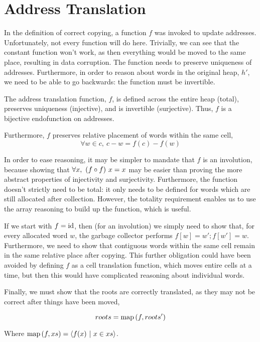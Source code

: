 \section{Address Translation}
\label{sec:copying-address}

In the definition of correct copying, a function $f$ was invoked to
update addresses. Unfortunately, not every function will do
here. Trivially, we can see that the constant function won't work, as
then everything would be moved to the same place, resulting in data
corruption. The function needs to preserve uniqueness of
addresses. Furthermore, in order to reason about words in the original
heap, $h'$, we need to be able to go backwards: the function must be
invertible.

\begin{definition}
  \label{def:c-address-translation-function}
  The address translation function, $f$, is defined across the entire
  heap (total), preserves uniqueness (injective), and is invertible
  (surjective). Thus, $f$ is a bijective endofunction on addresses.

  Furthermore, $f$ preserves relative placement of words within the
  same cell, \[\forall w \in c,\ c - w = f(c) - f(w)\]
\end{definition}

In order to ease reasoning, it may be simpler to mandate that $f$ is
an involution, because showing that $\forall x,\ (f \circ f)~x = x$ may
be easier than proving the more abstract properties of injectivity and
surjectivity. Furthermore, the function doesn't strictly need to be
total: it only needs to be defined for words which are still allocated
after collection. However, the totality requirement enables us to use
the array reasoning to build up the function, which is useful.

If we start with $f = \mathrm{id}$, then (for an involution) we simply need to
show that, for every allocated word $w$, the garbage collector
performs $f[w] = w'; f[w'] = w$. Furthermore, we need to show that
contiguous words within the same cell remain in the same relative
place after copying. This further obligation could have been avoided
by defining $f$ as a cell translation function, which moves entire
cells at a time, but then this would have complicated reasoning about
individual words.

Finally, we must show that the roots are correctly translated, as they
may not be correct after things have been moved,

\begin{definition}
  \label{def:c-root-translation}
  \[roots = \mathrm{map}\left(f, roots'\right)\]

  Where $\mathrm{map}\left(f, xs\right) = \langle f(x)~|~x \in xs \rangle$.
\end{definition}

